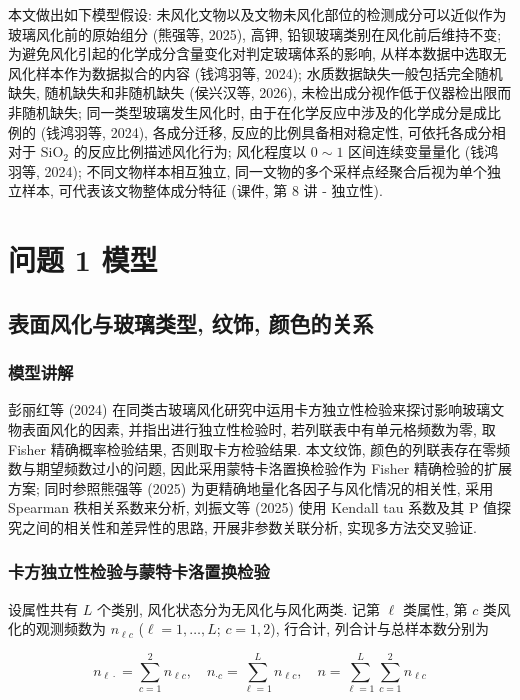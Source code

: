 \documentclass{ctexart}
\begin{document}
本文做出如下模型假设: 未风化文物以及文物未风化部位的检测成分可以近似作为玻璃风化前的原始组分 (熊强等, 2025), 高钾, 铅钡玻璃类别在风化前后维持不变; 为避免风化引起的化学成分含量变化对判定玻璃体系的影响, 从样本数据中选取无风化样本作为数据拟合的内容 (钱鸿羽等, 2024); 水质数据缺失一般包括完全随机缺失, 随机缺失和非随机缺失 (侯兴汉等, 2026), 未检出成分视作低于仪器检出限而非随机缺失; 同一类型玻璃发生风化时, 由于在化学反应中涉及的化学成分是成比例的 (钱鸿羽等, 2024), 各成分迁移, 反应的比例具备相对稳定性, 可依托各成分相对于 $\mathrm{SiO_2}$ 的反应比例描述风化行为; 风化程度以 $0\sim1$ 区间连续变量量化 (钱鸿羽等, 2024); 不同文物样本相互独立, 同一文物的多个采样点经聚合后视为单个独立样本, 可代表该文物整体成分特征 (课件, 第 8 讲 - 独立性).

\section{问题 1 模型}

\subsection{表面风化与玻璃类型, 纹饰, 颜色的关系}

\subsubsection{模型讲解}

彭丽红等 (2024) 在同类古玻璃风化研究中运用卡方独立性检验来探讨影响玻璃文物表面风化的因素, 并指出进行独立性检验时, 若列联表中有单元格频数为零, 取 Fisher 精确概率检验结果, 否则取卡方检验结果. 本文纹饰, 颜色的列联表存在零频数与期望频数过小的问题, 因此采用蒙特卡洛置换检验作为 Fisher 精确检验的扩展方案; 同时参照熊强等 (2025) \cite{xiongqiang2025}为更精确地量化各因子与风化情况的相关性, 采用 Spearman 秩相关系数来分析, 刘振文等 (2025) \cite{liuzhenwen2025}使用 Kendall tau 系数及其 P 值探究之间的相关性和差异性的思路, 开展非参数关联分析, 实现多方法交叉验证.


\subsubsection{卡方独立性检验与蒙特卡洛置换检验}

设属性共有 $L$ 个类别, 风化状态分为无风化与风化两类. 记第 $\ell$ 类属性, 第 $c$ 类风化的观测频数为 $n_{\ell{c}}$ ($\ell=1,\dots,L$; $c=1,2$), 行合计, 列合计与总样本数分别为

\begin{equation*}
n_{\ell\cdot}=\sum_{c=1}^{2}n_{\ell{c}},\quad{n}_{\cdot{c}}=\sum_{\ell=1}^{L}n_{\ell{c}},\quad{n}=\sum_{\ell=1}^{L}\sum_{c=1}^{2}n_{\ell{c}}
\end{equation*}
\end{document}

